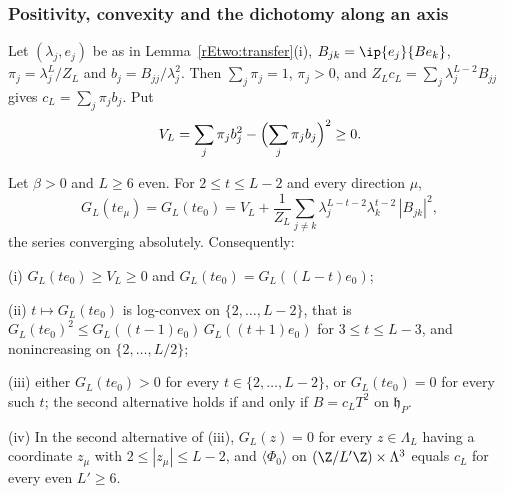 \subsubsection{Positivity, convexity and the dichotomy along an axis}

Let $(\lambda_j,e_j)$ be as in Lemma~\ref{rEtwo:transfer}(i), $B_{jk}=
\ip{e_j}{Be_k}$, $\pi_j=\lambda_j^L/Z_L$ and $b_j=B_{jj}/\lambda_j^2$. Then
$\sum_j\pi_j=1$, $\pi_j>0$, and $Z_Lc_L=\sum_j\lambda_j^{L-2}B_{jj}$ gives
$c_L=\sum_j\pi_jb_j$. Put
\[
V_L=\sum_j\pi_jb_j^2-\Bigl(\sum_j\pi_jb_j\Bigr)^2\ge0 .
\]

\begin{theorem}\label{rEtwo:axial}
Let $\beta>0$ and $L\ge6$ even. For $2\le t\le L-2$ and every direction
$\mu$,
\[
G_L(te_\mu)=G_L(te_0)=V_L+\frac1{Z_L}\sum_{j\ne k}\lambda_j^{L-t-2}
\lambda_k^{t-2}\,|B_{jk}|^2 ,
\]
the series converging absolutely. Consequently:

\textup{(i)} $G_L(te_0)\ge V_L\ge0$ and $G_L(te_0)=G_L((L-t)e_0)$;

\textup{(ii)} $t\mapsto G_L(te_0)$ is log-convex on $\{2,\dots,L-2\}$, that
is $G_L(te_0)^2\le G_L((t-1)e_0)\,G_L((t+1)e_0)$ for $3\le t\le L-3$, and
nonincreasing on $\{2,\dots,L/2\}$;

\textup{(iii)} either $G_L(te_0)>0$ for every $t\in\{2,\dots,L-2\}$, or
$G_L(te_0)=0$ for every such $t$; the second alternative holds if and
only if $B=c_LT^2$ on $\mathfrak h_P$.

\textup{(iv)} In the second alternative of \textup{(iii)}, $G_L(z)=0$ for
every $z\in\Lambda_L$ having a coordinate $z_\mu$ with $2\le|z_\mu|\le
L-2$, and $\langle\Phi_0\rangle$ on $(\Z/L'\Z)\times\Lambda^3$ equals $c_L$
for every even $L'\ge6$.
\end{theorem}

